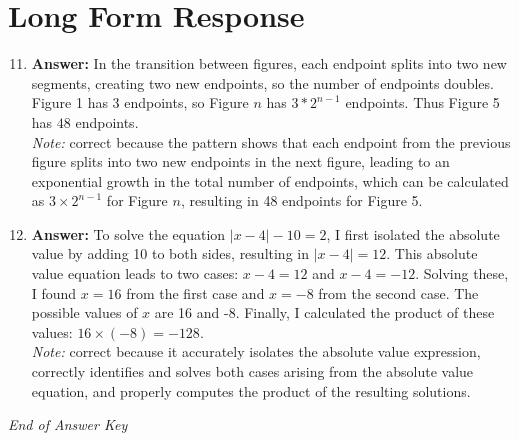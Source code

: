 \documentclass[12pt]{article}
\begin{document}
\section*{Long Form Response}
\begin{enumerate}[label=\arabic*.]
\setcounter{enumi}{10}
\item \textbf{Answer:} In the transition between figures, each endpoint splits into two new segments, creating two new endpoints, so the number of endpoints doubles. Figure 1 has $3$ endpoints, so Figure $n$ has $3*2^{n-1}$ endpoints. Thus Figure 5 has $\boxed{48}$ endpoints.
\\ \textit{Note:} correct because the pattern shows that each endpoint from the previous figure splits into two new endpoints in the next figure, leading to an exponential growth in the total number of endpoints, which can be calculated as \(3 \times 2^{n-1}\) for Figure \(n\), resulting in 48 endpoints for Figure 5.
\item \textbf{Answer:} To solve the equation \( |x-4| - 10 = 2 \), I first isolated the absolute value by adding 10 to both sides, resulting in \( |x-4| = 12 \). This absolute value equation leads to two cases: \( x - 4 = 12 \) and \( x - 4 = -12 \). Solving these, I found \( x = 16 \) from the first case and \( x = -8 \) from the second case. The possible values of \( x \) are 16 and -8. Finally, I calculated the product of these values: \( 16 \times (-8) = -128 \).
\\ \textit{Note:} correct because it accurately isolates the absolute value expression, correctly identifies and solves both cases arising from the absolute value equation, and properly computes the product of the resulting solutions.
\end{enumerate}

\vfill
\noindent\textit{End of Answer Key}
\end{document}

